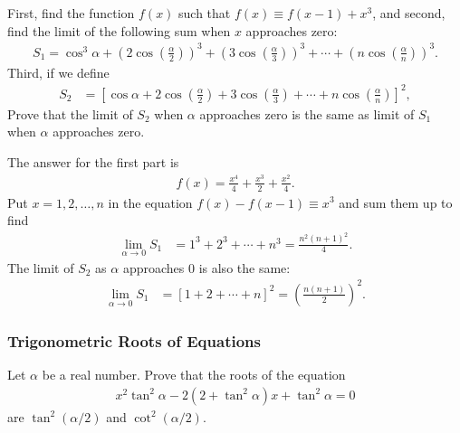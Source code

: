 \begin{question}
    First, find the function $f(x)$ such that $f(x) \equiv f(x-1) + x^3$, and second, find the limit of the following sum when $x$ approaches zero:
    \begin{align*}
        S_1 =\cos^3 \alpha + \left(2\cos\left(\frac{\alpha}{2}\right)\right)^3 + \left(3\cos\left(\frac{\alpha}{3}\right)\right)^3 + \cdots + \left(n\cos\left(\frac{\alpha}{n}\right)\right)^3.
    \end{align*}
    Third, if we define
    \begin{align*}
        S_2 &= \left[\cos \alpha + 2\cos\left(\frac{\alpha}{2}\right) + 3\cos\left(\frac{\alpha}{3}\right) + \cdots + n\cos\left(\frac{\alpha}{n}\right)\right]^2,
    \end{align*}
    Prove that the limit of $S_2$ when $\alpha$ approaches zero is the same as limit of $S_1$ when $\alpha$ approaches zero.
\end{question}

\begin{solution}
    The answer for the first part is 
    \begin{align*}
        f(x) = \frac{x^4}{4} + \frac{x^3}{2} + \frac{x^2}{4}.
    \end{align*}
    Put $x=1,2,\dots,n$ in the equation $f(x)-f(x-1) \equiv x^3$ and sum them up to find
    \begin{align*}
        \lim_{\alpha \to 0} S_1 &= 1^3 + 2^3 + \cdots + n^3 = \frac{n^2(n+1)^2}{4}.
    \end{align*}
    The limit of $S_2$ as $\alpha$ approaches $0$ is also the same:
    \begin{align*}
        \lim_{\alpha \to 0} S_1 &= \left[1 + 2 + \cdots + n \right]^2 = \left(\frac{n(n+1)}{2}\right)^2.
    \end{align*}
\end{solution}

\subsubsection{Trigonometric Roots of Equations}
\begin{question}
    Let $\alpha$ be a real number. Prove that the roots of the equation
    \begin{align*}
        x^2\tan^2\alpha - 2(2+\tan^2\alpha)x + \tan^2\alpha = 0
    \end{align*}
    are $\tan^2(\alpha/2)$ and $\cot^2(\alpha/2)$.
\end{question}


